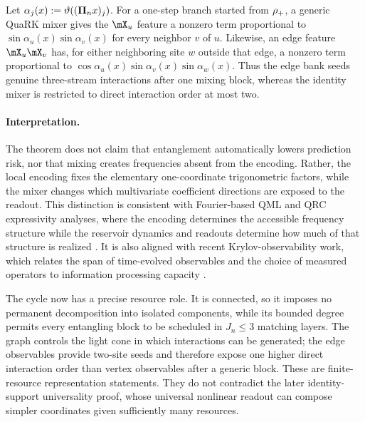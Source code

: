 \begin{corollary}
\label{cor:mixer-direct-interactions}
Let
$\alpha_j(x):=\vartheta((\bm{\Pi}_nx)_j)$.  For a one-step branch started
from $\rho_{+}$, a generic QuaRK mixer gives the $\pauliX_u$ feature a
nonzero term proportional to
$\sin\alpha_u(x)\sin\alpha_v(x)$ for every neighbor $v$ of $u$.  Likewise,
an edge feature $\pauliX_u\pauliX_v$ has, for either neighboring site $w$
outside that edge, a nonzero term proportional to
$\cos\alpha_u(x)\sin\alpha_v(x)\sin\alpha_w(x)$.
Thus the edge bank seeds genuine three-stream interactions after one mixing
block, whereas the identity mixer is restricted to direct interaction order at
most two.
\end{corollary}

\paragraph{Interpretation.}
The theorem does not claim that entanglement automatically lowers prediction
risk, nor that mixing creates frequencies absent from the encoding.  Rather,
the local encoding fixes the elementary one-coordinate trigonometric factors,
while the mixer changes which multivariate coefficient directions are exposed
to the readout.  This distinction is consistent with Fourier-based QML and QRC
expressivity analyses, where the encoding determines the accessible frequency
structure while the reservoir dynamics and readouts determine how much of that
structure is realized \citep{SchuldSwekeMeyer2021,SchuetteEtAl2026}.  It is
also aligned with recent Krylov-observability work, which relates the span of
time-evolved observables and the choice of measured operators to information
processing capacity \citep{CindrakLudgeJaurigue2025,CindrakJaurigueLudge2025}.

The cycle now has a precise resource role.  It is connected, so it imposes no
permanent decomposition into isolated components, while its bounded degree
permits every entangling block to be scheduled in $J_n\leq3$ matching layers.
The graph controls the light cone in which interactions can be generated; the
edge observables provide two-site seeds and therefore expose one higher direct
interaction order than vertex observables after a generic block.  These are
finite-resource representation statements.  They do not contradict the later
identity-support universality proof, whose universal nonlinear readout can
compose simpler coordinates given sufficiently many resources.

